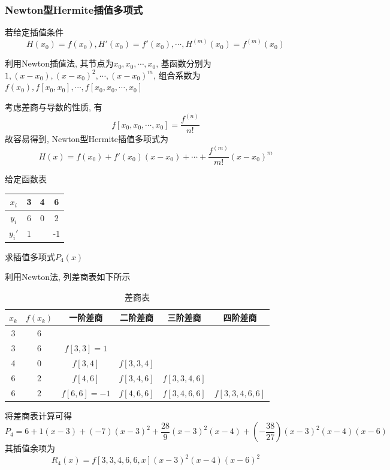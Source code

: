 \subsubsection{Newton型Hermite插值多项式}

若给定插值条件
\begin{equation*}
    H(x_0)=f(x_0),H'(x_0)=f'(x_0),\cdots,H^{(m)}(x_0)=f^{(m)}(x_0)
\end{equation*}

利用Newton插值法, 其节点为$x_0,x_0,\cdots,x_0$, 基函数分别为$1,(x-x_0),(x-x_0)^2,\cdots,(x-x_0)^m$, 组合系数为$f(x_0),f[x_0,x_0],\cdots,f[x_0,x_0,\cdots,x_0]$

考虑差商与导数的性质, 有
\begin{equation*}
    f[x_0,x_0,\cdots,x_0]=\frac{f^{(n)}}{n!}
\end{equation*}
故容易得到, Newton型Hermite插值多项式为
\begin{equation*}
    H(x)=f(x_0)+f'(x_0)(x-x_0)+\cdots+\frac{f^{(m)}}{m!}(x-x_0)^m
\end{equation*}

\begin{example}
    给定函数表
    \begin{table}[h]
        \centering
        \begin{tabular}{|c|c|c|c|}
            $x_i$&3&4&6\\
            \hline
            $y_i$&6&0&2\\
            \hline
            $y_i'$&1&&-1\\
        \end{tabular}
    \end{table}
    求插值多项式$P_4(x)$
\end{example}

\begin{solution}
    利用Newton法, 列差商表如下所示
    \begin{table}[h]\label{tab:1}
        \centering
        \caption{差商表}
        \begin{tabular}{|c|c|c|c|c|c|}
            $x_k$&$f(x_k)$&一阶差商&二阶差商&三阶差商&四阶差商\\
            \hline
            3&6& & & & \\
            3&6&$f[3,3]=1$& & &\\
            4&0&$f[3,4]$&$f[3,3,4]$& &\\
            6&2&$f[4,6]$&$f[3,4,6]$&$f[3,3,4,6]$&\\
            6&2&$f[6,6]=-1$&$f[4,6,6]$&$f[3,4,6,6]$&$f[3,3,4,6,6]$\\
        \end{tabular}
    \end{table}
    将差商表计算可得
    \begin{equation*}
        P_4=6+1(x-3)+(-7)(x-3)^2+\frac{28}{9}(x-3)^2(x-4)+\left(-\frac{38}{27}\right)(x-3)^2(x-4)(x-6)
    \end{equation*}
    其插值余项为
    \begin{equation*}
        R_4(x)=f[3,3,4,6,6,x](x-3)^2(x-4)(x-6)^2
    \end{equation*}
\end{solution}


